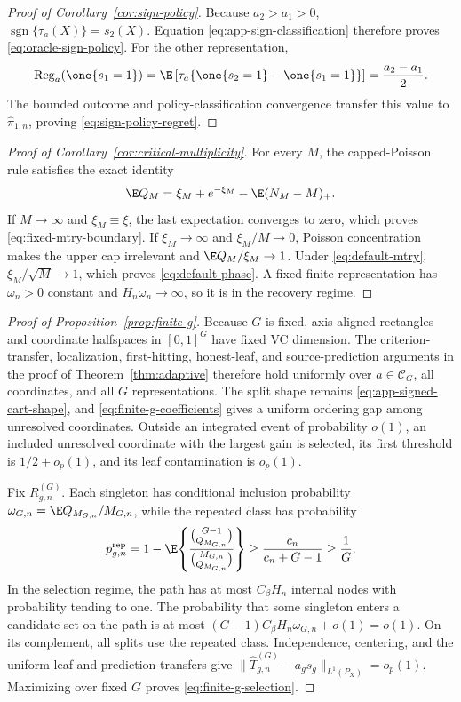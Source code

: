 \begin{appendix}
\begin{proof}[Proof of Corollary~\ref{cor:sign-policy}]
Because \(a_2>a_1>0\), \(\operatorname{sgn}\{\tau_a(X)\}=s_2(X)\). Equation
\eqref{eq:app-sign-classification} therefore proves
\eqref{eq:oracle-sign-policy}. For the other representation,
\[
\operatorname{Reg}_a(\one\{s_1=1\})
=\E\left[\tau_a
\{\one\{s_2=1\}-\one\{s_1=1\}\}\right]
=\frac{a_2-a_1}{2}.
\]
The bounded outcome and policy-classification convergence transfer this value
to \(\widehat\pi_{1,n}\), proving \eqref{eq:sign-policy-regret}.
\end{proof}

\begin{proof}[Proof of Corollary~\ref{cor:critical-multiplicity}]
For every \(M\), the capped-Poisson rule satisfies the exact identity
\[
\E Q_M=\xi_M+e^{-\xi_M}-\E(N_M-M)_+.
\]
If \(M\to\infty\) and \(\xi_M\equiv\xi\), the last expectation converges to
zero, which proves \eqref{eq:fixed-mtry-boundary}. If \(\xi_M\to\infty\) and
\(\xi_M/M\to0\), Poisson concentration makes the upper cap irrelevant and
\(\E Q_M/\xi_M\to1\). Under \eqref{eq:default-mtry},
\(\xi_M/\sqrt M\to1\), which proves \eqref{eq:default-phase}. A fixed
finite representation has \(\omega_n>0\) constant and
\(H_n\omega_n\to\infty\), so it is in the recovery regime.
\end{proof}

\begin{proof}[Proof of Proposition~\ref{prop:finite-g}]
Because \(G\) is fixed, axis-aligned rectangles and coordinate halfspaces in
\([0,1]^G\) have fixed VC dimension. The criterion-transfer, localization,
first-hitting, honest-leaf, and source-prediction arguments in the proof of
Theorem~\ref{thm:adaptive} therefore hold uniformly over
\(a\in\mathcal C_G\), all coordinates, and all \(G\) representations. The split
shape remains \eqref{eq:app-signed-cart-shape}, and
\eqref{eq:finite-g-coefficients} gives a uniform ordering gap among unresolved
coordinates. Outside an integrated event of probability \(o(1)\), an included
unresolved coordinate with the largest gain is selected, its first threshold
is \(1/2+o_p(1)\), and its leaf contamination is \(o_p(1)\).

Fix \(R_{g,n}^{(G)}\). Each singleton has conditional inclusion probability
\(\omega_{G,n}=\E Q_{M_{G,n}}/M_{G,n}\), while the repeated class has probability
\[
p_{g,n}^{\rm rep}
=1-\E\!\left\{
\frac{\binom{G-1}{Q_{M_{G,n}}}}
{\binom{M_{G,n}}{Q_{M_{G,n}}}}
\right\}
\ge \frac{c_n}{c_n+G-1}\ge\frac1G.
\]
In the selection regime, the path has at most \(C_\beta H_n\) internal nodes
with probability tending to one. The probability that some singleton enters a
candidate set on the path is at most
\((G-1)C_\beta H_n\omega_{G,n}+o(1)=o(1)\).
On its complement, all splits use the repeated class. Independence, centering,
and the uniform leaf and prediction transfers give
\(\|\widehat T_{g,n}^{(G)}-a_gs_g\|_{L^1(P_X)}=o_p(1)\). Maximizing over fixed
\(G\) proves \eqref{eq:finite-g-selection}.


\end{proof}
\end{appendix}
